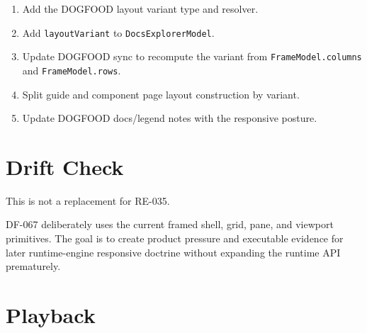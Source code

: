 \begin{enumerate}
\def\labelenumi{\arabic{enumi}.}
\tightlist
\item
  Add the DOGFOOD layout variant type and resolver.
\item
  Add \texttt{l\allowbreak{}a\allowbreak{}y\allowbreak{}o\allowbreak{}u\allowbreak{}t\allowbreak{}V\allowbreak{}a\allowbreak{}r\allowbreak{}i\allowbreak{}a\allowbreak{}n\allowbreak{}t} to \texttt{D\allowbreak{}o\allowbreak{}c\allowbreak{}s\allowbreak{}E\allowbreak{}x\allowbreak{}p\allowbreak{}l\allowbreak{}o\allowbreak{}r\allowbreak{}e\allowbreak{}r\allowbreak{}M\allowbreak{}o\allowbreak{}d\allowbreak{}e\allowbreak{}l}.
\item
  Update DOGFOOD sync to recompute the variant from \texttt{F\allowbreak{}r\allowbreak{}a\allowbreak{}m\allowbreak{}e\allowbreak{}M\allowbreak{}o\allowbreak{}d\allowbreak{}e\allowbreak{}l\allowbreak{}.\allowbreak{}c\allowbreak{}o\allowbreak{}l\allowbreak{}u\allowbreak{}m\allowbreak{}n\allowbreak{}s} and \texttt{F\allowbreak{}r\allowbreak{}a\allowbreak{}m\allowbreak{}e\allowbreak{}M\allowbreak{}o\allowbreak{}d\allowbreak{}e\allowbreak{}l\allowbreak{}.\allowbreak{}r\allowbreak{}o\allowbreak{}w\allowbreak{}s}.
\item
  Split guide and component page layout construction by variant.
\item
  Update DOGFOOD docs/legend notes with the responsive posture.
\end{enumerate}

\section{Drift Check}\label{record-108-drift-check}

This is not a replacement for RE-035.

DF-067 deliberately uses the current framed shell, grid, pane, and viewport primitives. The goal is to create product pressure and executable evidence for later runtime-engine responsive doctrine without expanding the runtime API prematurely.

\section{Playback}\label{record-108-playback}

